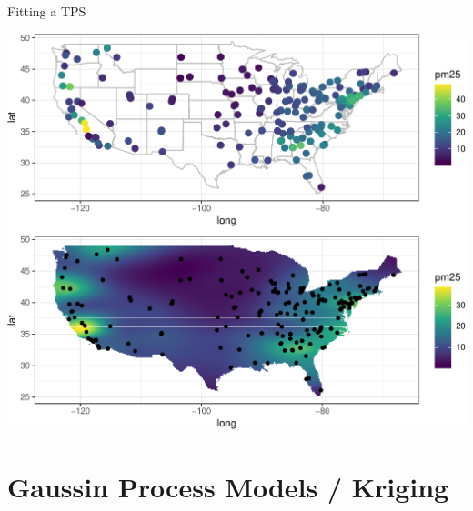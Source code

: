 \documentclass[11pt,ignorenonframetext,]{beamer}
\let\oldShaded\Shaded
\let\endoldShaded\endShaded
\let\oldverbatim\verbatim
\let\endoldverbatim\endverbatim
\newcommand{\scriptoutput}{
  \renewenvironment{Shaded}{\scriptsize\begin{spacing}{0.9}\oldShaded}{\endoldShaded\end{spacing}}
  \renewenvironment{verbatim}{\scriptsize\begin{spacing}{0.9}\oldverbatim}{\endoldverbatim\end{spacing}}
}
\begin{document}
\begin{frame}[t]{Fitting a TPS}
\protect\hypertarget{fitting-a-tps}{}

\scriptoutput

\begin{center}\includegraphics[width=\textwidth]{Lec19_files/figure-beamer/unnamed-chunk-32-1} \end{center}

\end{frame}

\hypertarget{gaussin-process-models-kriging}{%
\section{Gaussin Process Models /
Kriging}\label{gaussin-process-models-kriging}}
\end{document}
